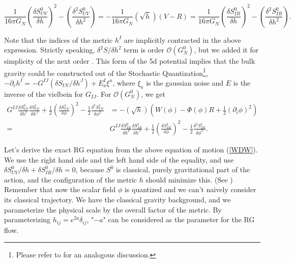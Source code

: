 \documentclass[12pt,epsbox]{article}
\numberwithin{equation}{section}
\begin{document}
\begin{equation}
\frac{1}{16 \pi G_N} \left(\frac{\delta S^0_{UV}}{\delta h} \right)^2 - \left( \frac{\delta^2 S^0_{UV}}{\delta h^2} \right) = -\frac{1}{16 \pi G_N} (\sqrt{h}) (V-R) =
\frac{1}{16 \pi G_N} \left(\frac{\delta S^0_{IR}}{\delta h} \right)^2 - \left( \frac{\delta^2 S^0_{IR}}{\delta h^2} \right).
\end{equation}

Note that the indices of the metric $h^I$ are implicitly contracted in the above expression. Strictly speaking, $\delta^2 S / \delta h^2$ term is order $\mathcal{O}(G_N^0)$, but we added it for simplicity of the next order \cite{GiladSchwinger}. This form of the 5d potential implies that the bulk gravity could be constructed out of the Stochastic Quantization\footnote{Please refer to \cite{Nishioka} for an analogous discussion.}, $ -\partial_r h^I=-G^{IJ}(\delta S_{UV} / \delta h^J) + E^I_a \xi^a$, where $\xi_a$ is the gaussian noise and $E$ is the inverse of the vielbein for $G_{IJ}$\cite{Susanne}. For $\mathcal{O}(G_N^0)$, we get
\begin{equation}
\begin{split}
G^{IJ} \frac{\delta S^0_{UV}}{\delta h^I} \frac{\delta S^1_{UV}}{\delta h^J} +\frac{1}{2} \left( \frac{ \delta S^1_{UV}}{\delta \phi} \right)^2 - \frac{1}{2}\frac{\delta^2 S^1_{UV}}{\delta \phi^2} &= -(\sqrt{h}) (W(\phi)-\Phi(\phi)R+\frac{1}{2}(\partial_i \phi)^2)\\
=&G^{IJ}\frac{\delta S^0_{IR}}{\delta h^I}\frac{\delta S^1_{IR}}{\delta h^J} +\frac{1}{2} \left( \frac{\delta S^1_{IR}}{\delta \phi} \right)^2 - \frac{1}{2} \frac{\delta^2 S^1_{IR}}{\delta \phi^2}.\label{WDW}
\end{split}
\end{equation}

 Let's derive the exact RG equation from the above equation of motion (\ref{WDW}). We use the right hand side and the left hand side of the equality, and use $\delta S^0_{UV} / \delta h + \delta S^0_{IR} / \delta h = 0$, because $S^0$ is classical, purely gravitational part of the action, and the configuration of the metric $h$ should minimize this. (See \cite{VV}) Remember that now the scalar field $\phi$ is quantized and we can't naively consider its classical trajectory. We have the classical gravity background, and we parameterize the physical scale by the overall factor of the metric. By parameterizing $h_{ij}= e^{2a} \delta_{ij}$, "$-a$" can be considered as the parameter for the RG flow.
\end{document}
